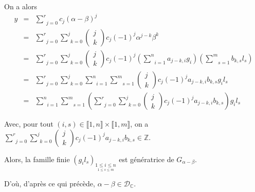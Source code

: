 On a alors
\begin{eqnarray*}
  y & = & \underset{j = 0}{\overset{r}{\sum}} c_j (\alpha - \beta)^j\\
  & = & \underset{j = 0}{\overset{r}{\sum}} \underset{k =
  0}{\overset{j}{\sum}} \left( \begin{array}{c}
    j\\
    k
  \end{array} \right) c_j (- 1)^j \alpha^{j - k} \beta^k\\
  & = & \underset{j = 0}{\overset{r}{\sum}} \underset{k =
  0}{\overset{j}{\sum}} \left( \begin{array}{c}
    j\\
    k
  \end{array} \right) c_j (- 1)^j \left( \underset{i = 1}{\overset{n}{\sum}}
  a_{j - k, i} g_i \right) \left( \underset{s = 1}{\overset{m}{\sum}} b_{k, s}
  l_s \right)\\
  & = & \underset{j = 0}{\overset{r}{\sum}} \underset{k =
  0}{\overset{j}{\sum}} \underset{i = 1}{\overset{n}{\sum}} \underset{s =
  1}{\overset{m}{\sum}} \left( \begin{array}{c}
    j\\
    k
  \end{array} \right) c_j (- 1)^j a_{j - k, i} b_{k, s} g_i l_s\\
  & = & \underset{i = 1}{\overset{n}{\sum}} \underset{s =
  1}{\overset{m}{\sum}} \left( \underset{j = 0}{\overset{r}{\sum}} \underset{k
  = 0}{\overset{j}{\sum}} \left( \begin{array}{c}
    j\\
    k
  \end{array} \right) c_j (- 1)^j a_{j - k, i} b_{k, s} \right) g_i l_s
\end{eqnarray*}


Avec, pour tout $(i, s) \in \llbracket 1, n \rrbracket \times \llbracket 1, m
\rrbracket$, on a $\underset{j = 0}{\overset{r}{\sum}} \underset{k =
0}{\overset{j}{\sum}} \left( \begin{array}{c}
  j\\
  k
\end{array} \right) c_j (- 1)^j a_{j - k, i} b_{k, s} \in \mathbb{Z}$.

Alors, la famille finie $(g_i l_s)_{\underset{1 \leqslant s \leqslant m}{1
\leqslant i \leqslant n}}$ est g{\'e}n{\'e}ratrice de $G_{\alpha - \beta}$.

D'o{\`u}, d'apr{\`e}s ce qui pr{\'e}c{\`e}de, $\alpha - \beta \in
\mathcal{D}_{\mathbb{C}}$.

